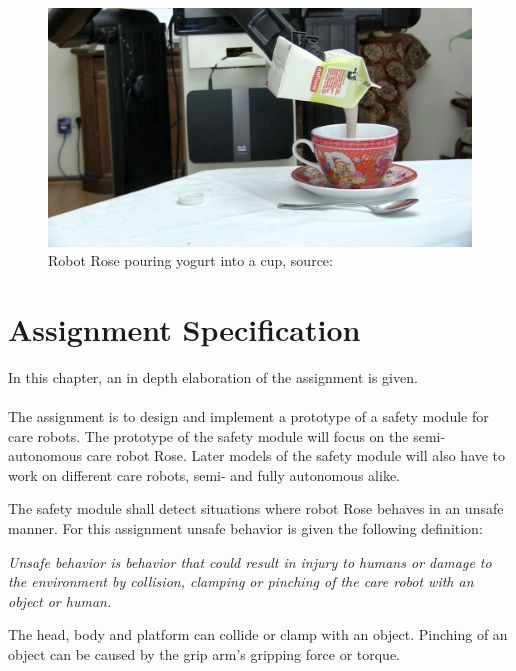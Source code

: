 \documentclass[12pt]{scrreprt}
\begin{document}
\begin{figure}[H]
    \centering
    \includegraphics[width=\textwidth]{Figures/pouring_milk_into_a_cup.jpg}
    \caption{Robot Rose pouring yogurt into a cup, source: \cite{rose_specification}}
    \label{fig:rose_milking}
\end{figure}

\chapter{Assignment Specification}

\label{Assignment specification}

In this chapter, an in depth elaboration of the assignment is given.
\\\\
The assignment is to design and implement a prototype of a safety module for care robots. The prototype of the safety module will focus on the semi-autonomous care robot Rose. Later models of the safety module will also have to work on different care robots, semi- and fully autonomous alike.
\par
The safety module shall detect situations where robot Rose behaves in an unsafe manner. For this assignment unsafe behavior is given the following definition:
\begin{flushleft}
\textit{Unsafe behavior is behavior that could result in injury to humans or damage to the environment by collision, clamping or pinching of the care robot with an object or human.}
\end{flushleft}
The head, body and platform can collide or clamp with an object. Pinching of an object can be caused by the grip arm's gripping force or torque. %
 
\end{document}

